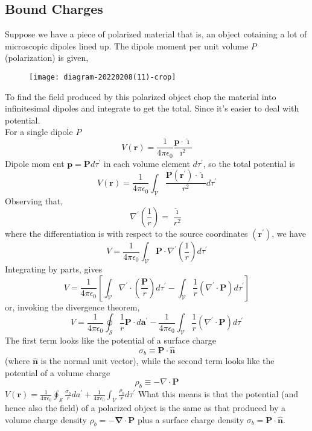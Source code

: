 \subsection{Bound Charges}
Suppose we have a piece of polarized material that is, an object cotaining a lot of microscopic dipoles lined up. The dipole moment per unit volume $P$ (polarization) is given, 
\begin{figure}[H]
	\centering
	\texttt{[image: diagram-20220208(11)-crop]}
\end{figure}
To find the field produced by this polarized object chop the material into infinitesimal dipoles and integrate to get the total. Since it's easier to deal with potential.\\
For a single dipole $P$\\
$$V(\mathbf{r})=\frac{1}{4 \pi \epsilon_{0}} \frac{\mathbf{p} \cdot \hat{\imath}}{\imath^{2}}$$
Dipole mom                                                                                                                                                                                                                                                                                                                                                                                                                                  ent $\mathbf{p}=\mathbf{P} d \tau^{\prime}$ in each volume element $d \tau^{\prime}$, so the total potential is
$$
V(\mathbf{r})=\frac{1}{4 \pi \epsilon_{0}} \int_{\mathcal{V}} \frac{\mathbf{P}\left(\mathbf{r}^{\prime}\right) \cdot \hat{\imath}}{r^{2}} d \tau^{\prime}
$$
Observing that,
$$\nabla^{\prime}\left(\frac{1}{r}\right)=\frac{\hat{\imath}}{r^{2}}$$
where  the differentiation is with respect to the source coordinates $\left(\mathbf{r}^{\prime}\right)$, we have
$$
V=\frac{1}{4 \pi \epsilon_{0}} \int_{\mathcal{V}} \mathbf{P} \cdot \nabla^{\prime}\left(\frac{1}{r}\right) d \tau^{\prime}
$$
Integrating by parts,  gives
$$
V=\frac{1}{4 \pi \epsilon_{0}}\left[\int_{\mathcal{V}} \nabla^{\prime} \cdot\left(\frac{\mathbf{P}}{r}\right) d \tau^{\prime}-\int_{\mathcal{V}} \frac{1}{r}\left(\nabla^{\prime} \cdot \mathbf{P}\right) d \tau^{\prime}\right]
$$
or, invoking the divergence theorem,
$$
V=\frac{1}{4 \pi \epsilon_{0}} \oint_{\mathcal{S}} \frac{1}{r} \mathbf{P} \cdot d \mathbf{a}^{\prime}-\frac{1}{4 \pi \epsilon_{0}} \int_{\mathcal{V}} \frac{1}{r}\left(\nabla^{\prime} \cdot \mathbf{P}\right) d \tau^{\prime}
$$
The first term looks like the potential of a surface charge
$$
\sigma_{b} \equiv \mathbf{P} \cdot \hat{\mathbf{n}}
$$
(where $\hat{\mathbf{n}}$ is the normal unit vector), while the second term looks like the potential of a volume charge
$$
\rho_{b} \equiv-\nabla \cdot \mathbf{P}
$$
$V(\mathbf{r})=\frac{1}{4 \pi \epsilon_{0}} \oint_{\mathcal{S}} \frac{\sigma_{b}}{r} d a^{\prime}+\frac{1}{4 \pi \epsilon_{0}} \int_{\mathcal{V}} \frac{\rho_{b}}{r} d \tau^{\prime}$
What this means is that the potential (and hence also the field) of a polarized object is the same as that produced by a volume charge density $\rho_{b}=-\boldsymbol{\nabla} \cdot \mathbf{P}$ plus a surface charge density $\sigma_{b}=\mathbf{P} \cdot \hat{\mathbf{n}}$. 
